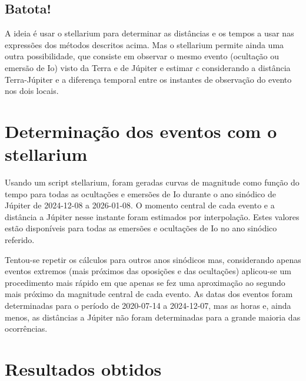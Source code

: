 \documentclass[]{article}
\begin{document}
\subsection{Batota!}
A ideia é usar o stellarium para determinar as distâncias e os tempos a usar nas
expressões dos métodos descritos acima. Mas o stellarium permite ainda uma outra
possibilidade, que consiste em observar o mesmo evento (ocultação ou emersão de
Io) visto da Terra e de Júpiter e estimar $c$ considerando a distância
Terra-Júpiter e a diferença temporal entre os instantes de observação do evento
nos dois locais.

\section{Determinação dos eventos com o stellarium}
Usando um script stellarium, foram geradas curvas de magnitude como função do
tempo para todas as ocultações e emersões de Io durante o ano sinódico de
Júpiter de 2024-12-08 a 2026-01-08. O momento central de cada evento e a
distância a Júpiter nesse instante foram estimados por interpolação. Estes
valores estão disponíveis para todas as emersões e ocultações de Io no ano
sinódico referido.

Tentou-se repetir os cálculos para outros anos sinódicos mas, considerando
apenas eventos extremos (mais próximos das oposições e das ocultações)
aplicou-se um procedimento mais rápido em que apenas se fez uma
aproximação ao segundo mais próximo da magnitude central de cada evento. As
datas dos eventos foram determinadas para o período de 2020-07-14 a 2024-12-07,
mas as horas e, ainda menos, as distâncias a Júpiter não foram determinadas para
a grande maioria das ocorrências.


\section{Resultados obtidos}
\end{document}
